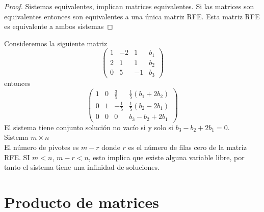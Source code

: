 \documentclass[12pt,a4paper]{book}
\newcommand{\parentesis}[1]{\left(#1\right)}
\begin{document}
    \begin{proof}
        Sistemas equivalentes, implican matrices equivalentes. Si las matrices son
        equivalentes entonces son equivalentes a una única matriz RFE. Esta matriz
        RFE es equivalente a ambos sistemas
    \end{proof}

    \begin{ejemplo}
    \label{ej:11}
        Consideremos la siguiente matriz
        \begin{equation*}
            \parentesis{
                \begin{array}{ccc|c}
                    1 & -2 & 1 & b_{1}\\
                    2 & 1 & 1 & b_{2}\\
                    0 & 5 & -1 & b_{3}
                \end{array}
            }
        \end{equation*}
        entonces
        \begin{equation*}
            \parentesis{
                \begin{array}{ccc|c}
                    1 & 0 & \frac{3}{5} & \frac{1}{5}(b_{1}+2b_{2})\\
                    0 & 1 & -\frac{1}{5} & \frac{1}{5}(b_{2}-2b_{1})\\
                    0 & 0 & 0 & b_{3}-b_{2}+2b_{1}
                \end{array}
            }
        \end{equation*}
        El sistema tiene conjunto solución no vacío si y solo si $b_{3}-b_{2}+2b_{1}=0$.\\
        Sistema $m\times n$\\
        El número de pivotes es $m-r$ donde $r$ es el número de filas cero de la matriz
        RFE. SI $m\lt n$, $m-r\lt n$, esto implica que existe alguna variable libre, por
        tanto el sistema tiene una infinidad de soluciones.
    \end{ejemplo}
    

    \section{Producto de matrices}
\end{document}
